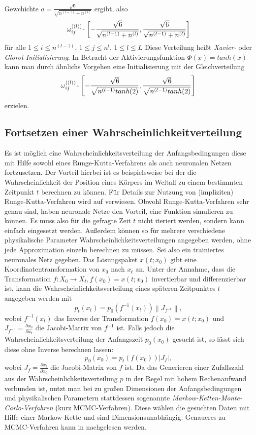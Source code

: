 Gewchichte $a=\frac{\sqrt {6}}{\sqrt {n^{(l-1)} + n^{(l)}}}$ ergibt, also
\[
    \omega_{ij}^{((l))} \raisebox{-0.9ex}{\~{}}
    \left[ -\frac{\sqrt {6}}{\sqrt {n^{(l-1)} + n^{(l)}}}, \frac{\sqrt {6}}{\sqrt {n^{(l-1)} + n^{(l)}}} \right]
\]
für alle $1\leq i \leq n^{(l-1)}$, $1\leq j \leq n^{l}$, $1\leq l \leq L$ Diese Verteilung heißt \textit{Xavier-} oder
\textit{Glorot-Initialisierung}. In Betracht der Aktivierungsfunktion $\Phi(x)=tanh(x)$ kann man durch ähnlichs Vorgehen
eine Initialisierung mit der Gleichverteilung
\[
    \omega_{ij}^{((l))} \raisebox{-0.9ex}{\~{}}
    \left[ -\frac{\sqrt {6}}{\sqrt {n^{(l-1)} tanh(2)}}, \frac{\sqrt {6}}{\sqrt {n^{(l-1)} tanh(2)}} \right]
\]
erzielen.

\subsection{Fortsetzen einer Wahrscheinlichkeitverteilung}
\label{subsec:fortsetzeneinerwahrscheinlichkeitsverteilung}
Es ist möglich eine Wahrscheinlichkeitsverteilung der Anfangsbedingungen diese mit Hilfe sowohl eines
Runge-Kutta-Verfahrens als auch neuronalen Netzen fortzusetzen. Der Vorteil hierbei ist es beispielsweise bei der
die Wahrscheinlichkeit der Position eines Körpers im Weltall zu einem bestimmten Zeitpunkt $t$ berechnen zu können. Für
Details zur Nutzung von (impliziten) Runge-Kutta-Verfahren wird auf \cite{aristoffIMPLICITRUNGEKUTTAMETHODS} verwiesen.
Obwohl Runge-Kutta-Verfahren sehr genau sind, haben neuronale Netze den Vorteil, eine Funktion simulieren zu können.
Es muss also für die gefragte Zeit $t$ nicht iteriert werden, sondern kann einfach eingesetzt werden. Außerdem können
so für mehrere verschiedene physikalische Parameter Wahrscheinlichkeitsverteilungen angegeben werden, ohne jede
Approximation einzeln berechnen zu müssen. Sei also ein trainiertes neuronales Netz gegeben. Das Lösungspaket
$x(t; x_0)$ gibt eine Koordinatentransformation von $x_0$ nach $x_t$ an. Unter der Annahme, dass die Transformation
$f: X_0 \rightarrow X_t, f(x_0) = x(t;x_0)$ invertierbar und differenzierbar ist, kann die Wahrscheinlichkeitsverteilung
eines späteren Zeitpunktes $t$ angegeben werden mit
\[
    p_t(x_t) = p_0(f^{-1}(x_t)) \left\lVert J_{f^{-1}} \right\rVert,
\]
wobei $f^{-1}(x_t)$ das Inverse der Transformation $f(x_0)=x(t;x_0)$ und $J_{f^{-1}}= \frac{\partial x_0}{\partial x_t}$
die Jacobi-Matrix von $f^{-1}$ ist. Falls jedoch die Wahrscheinlichkeitsverteilung der Anfangszeit $p_0(x_0)$ gesucht
ist, so lässt sich diese ohne Inverse berechnen lassen:
\[
    p_0(x_0) = p_t(f(x_0))|J_f|,
\]
wobei $J_f= \frac{\partial x_t}{\partial x_0}$ die Jacobi-Matrix von $f$ ist. Da das Generieren einer Zufallszahl aus
der Wahrscheinlichkeitsverteilung $p$ in der Regel mit hohem Rechenaufwand verbunden ist, nutzt man bei zu großen
Dimensionen der Anfangsbedingungen und physikalischen Parametern stattdessen sogenannte
\textit{Markow-Ketten-Monte-Carlo-Verfahren} (kurz MCMC-Verfahren). Diese wählen die gesuchten Daten mit Hilfe einer
Markow-Kette und sind Dimensionsunabhängig: Genaueres zu MCMC-Verfahren kann in \cite{SamplingMethods} nachgelesen
werden.
